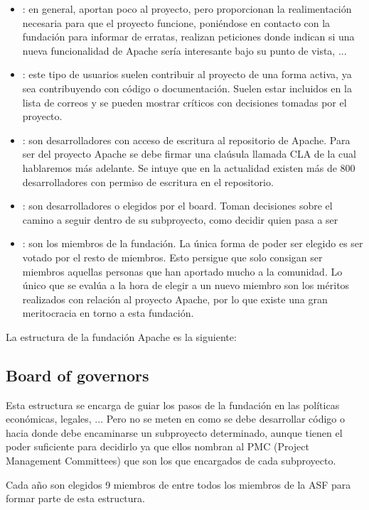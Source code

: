 \begin{itemize}
\item
{}: en general, aportan poco al proyecto, pero proporcionan la realimentaci\'on necesaria para que el proyecto funcione, poni\'endose en contacto con la fundaci\'on para informar de erratas, realizan peticiones donde indican si una nueva funcionalidad de Apache ser\'ia interesante bajo su punto de vista, ...
\item
{}: este tipo de usuarios suelen contribuir al proyecto de una forma activa, ya sea contribuyendo con c\'odigo o documentaci\'on. Suelen estar incluidos en la lista de correos y se pueden mostrar cr\'iticos con decisiones tomadas por el proyecto.
\item
{}: son desarrolladores con acceso de escritura al repositorio de Apache. Para ser  del proyecto Apache se debe firmar una cla\'usula llamada CLA de la cual hablaremos m\'as adelante. Se intuye que en la actualidad existen m\'as de 800 desarrolladores con permiso de escritura en el repositorio.
\item
{}: son desarrolladores o  elegidos por el board. Toman decisiones sobre el camino a seguir dentro de su subproyecto, como decidir quien pasa a ser 
\item
{}: son los miembros de la fundaci\'on. La \'unica forma de poder ser elegido es ser votado por el resto de miembros. Esto persigue que solo consigan ser miembros aquellas personas que han aportado mucho a la comunidad. Lo \'unico que se eval\'ua a la hora de elegir a un nuevo miembro son los m\'eritos realizados con relaci\'on al proyecto Apache, por lo que existe una gran meritocracia en torno a esta fundaci\'on.
\end{itemize}

La estructura de la fundaci\'on Apache es la siguiente:
\subsection{Board of governors}
Esta estructura se encarga de guiar los pasos de la fundaci\'on en las pol\'iticas econ\'omicas, legales, ... Pero no se meten en como se debe desarrollar c\'odigo o hacia donde debe encaminarse un subproyecto determinado, aunque tienen el poder suficiente para decidirlo ya que ellos nombran al PMC (Project Management Committees) que son los que encargados de cada subproyecto.

Cada año son elegidos 9 miembros de entre todos los miembros de la ASF para formar parte de esta estructura.

